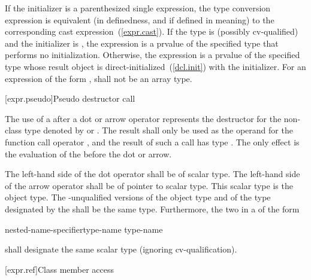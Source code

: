 \pnum
If the initializer is a parenthesized single expression,
the type conversion expression is equivalent (in
definedness, and if defined in meaning) to the corresponding cast
expression~(\ref{expr.cast}).
%
If the type is (possibly cv-qualified) 
and the initializer is \tcode{()},
the expression is a prvalue of the specified type
that performs no initialization.
Otherwise,
the expression is a prvalue of the specified type
whose result object is direct-initialized~(\ref{dcl.init})
with the initializer.
For an expression of the form ,
 shall not be an array type.

[expr.pseudo]{Pseudo destructor call}

\pnum
{}%
%
%
The use of a  after a dot  or
arrow \tcode{->} operator represents the destructor for the non-class
type denoted by  or .
The result shall only be used as the
operand for the function call operator \tcode{()}, and the result of
such a call has type . The only effect is the evaluation of
the  before the dot or arrow.

\pnum
The left-hand side of the dot operator shall be of scalar type. The
left-hand side of the arrow operator shall be of pointer to scalar type.
This scalar type is the object type. The -unqualified
versions of the object type and of the type designated by the
 shall be the same type. Furthermore,
the two  in a  of
the form

\begin{ncbnf}
nested-name-specifier\opt type-name \terminal{::\,\tilde} type-name
\end{ncbnf}

shall designate the same scalar type (ignoring cv-qualification).

[expr.ref]{Class member access}

